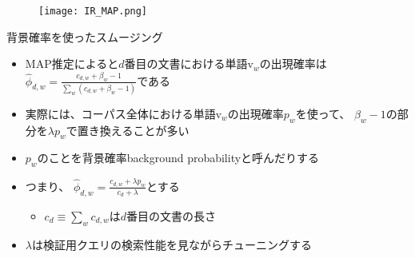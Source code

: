\documentclass[aspectratio=169,unicode,dvipdfmx,14pt]{beamer}
\begin{document}
\begin{frame}
\begin{figure}[htbp]
\begin{center}
\texttt{[image: IR\_MAP.png]}
\label{}
\end{center}
\end{figure}
\end{frame}

\begin{frame}{背景確率を使ったスムージング}
\begin{itemize}
\item MAP推定によると$d$番目の文書における単語$\mbox{v}_w$の出現確率は
$\hat{\phi}_{d,w} = \frac{c_{d,w} + \beta_w - 1}{\sum_w (c_{d,w} + \beta_w - 1)}$である
\item 実際には、コーパス全体における単語$\mbox{v}_w$の出現確率$p_w$を使って、
$\beta_w - 1$の部分を$\lambda p_w$で置き換えることが多い
\item $p_w$のことを背景確率background probabilityと呼んだりする
\item つまり、
$\hat{\phi}_{d,w} = \frac{c_{d,w} + \lambda p_w}{c_d + \lambda}$とする
\begin{itemize}
\item $c_d \equiv \sum_w c_{d,w}$は$d$番目の文書の長さ
\end{itemize}
\item $\lambda$は検証用クエリの検索性能を見ながらチューニングする
\end{itemize}
\end{frame}
\end{document}

